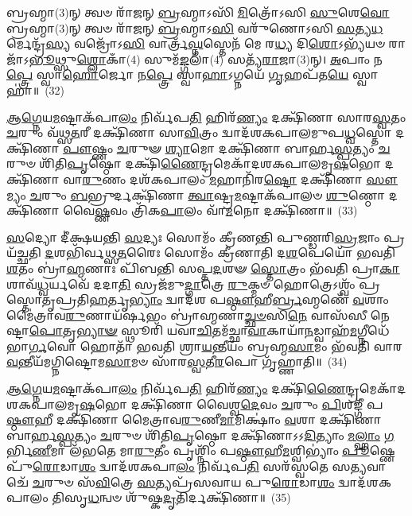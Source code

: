 𑌬𑍍𑌰𑌹𑍍𑌮𑌾(3)𑌨𑍍 𑌤𑍍𑌵𑍞 𑌰𑌾᳴𑌜𑌨𑍍 \ul{𑌬𑍍𑌰}\-𑌹𑍍𑌮𑌾\-𑌽𑌸𑌿᳴ \ul{𑌮𑌿}\-𑌤𑍍𑌰𑍋᳴\-𑌽𑌸𑌿 \ul{𑌸𑍁}\-𑌶𑍇\-\ul{𑌵𑍋} 𑌬𑍍𑌰𑌹𑍍𑌮𑌾(3)𑌨𑍍 𑌤𑍍𑌵𑍞 𑌰𑌾᳴𑌜𑌨𑍍 \ul{𑌬𑍍𑌰}\-𑌹𑍍𑌮𑌾\-𑌽\-\ul{𑌸𑌿} 𑌵𑌰𑍁᳴𑌣𑍋\-𑌽𑌸𑌿 \ul{𑌸}\-𑌤𑍍𑌯\-\ul{𑌧}\-𑌰𑍍𑌮𑍇𑌨𑍍𑌦𑍍𑌰᳴\-\ul{𑌸𑍍𑌯} 𑌵𑌜𑍍𑌰𑍋᳴\-𑌽\-\ul{𑌸𑌿} 𑌵𑌾𑌰𑍍𑌤𑍍𑌰᳴\-\ul{𑌘𑍍𑌨}\-𑌸𑍍𑌤𑍇𑌨᳴ 𑌮𑍇 𑌰\-\ul{𑌧𑍍𑌯} 𑌦𑌿\-\ul{𑌶𑍋}\-\-𑌽𑌭𑍍𑌯᳴𑌯𑍞 𑌰𑌾𑌜𑌾᳴\-𑌽\-\ul{𑌭𑍂}\-𑌥𑍍𑌸𑍁\-\ul{𑌶𑍍𑌲𑍋}\-𑌕𑌾𑌁(4) 𑌸𑍁𑌮᳴\-\ul{𑌙𑍍𑌗}\-𑌲𑌾𑌁(4) 𑌸𑌤𑍍𑌯᳴\-\ul{𑌰𑌾}\-𑌜𑌾(3)𑌨𑍍। \ul{𑌅}\-𑌪𑌾𑌂 𑌨\-\ul{𑌪𑍍𑌤𑍍𑌰𑍇} 𑌸𑍍𑌵𑌾\-\ul{𑌹𑍋}\-𑌰𑍍𑌜𑍋 𑌨\-\ul{𑌪𑍍𑌤𑍍𑌰𑍇} 𑌸𑍍𑌵𑌾\-\ul{𑌹𑌾}\-\-𑌽𑌗𑍍𑌨𑌯𑍇᳴ \ul{𑌗𑍃}\-𑌹𑌪᳴𑌤\-\ul{𑌯𑍇} 𑌸𑍍𑌵𑌾𑌹𑌾॑॥~(32)

{\anuvakamend[{\-\ul{𑌸}\-𑌤𑍍𑌯𑍗𑌜𑌾॑𑌶𑍍𑌚𑌤𑍍𑌵𑌾\-\ul{𑌰𑌿}\-\-\ul{𑍞}\-𑌶𑌚𑍍𑌚᳴}]}%

\-\ul{𑌆}\-\-\ul{𑌗𑍍𑌨𑍇}\-𑌯\-\ul{𑌮}\-𑌷𑍍𑌟𑌾\-𑌕᳴𑌪𑌾\-\ul{𑌲𑌂} 𑌨𑌿𑌰𑍍𑌵᳴𑌪\-\ul{𑌤𑌿} 𑌹𑌿𑌰᳴\-\ul{𑌣𑍍𑌯𑌂} 𑌦𑌕𑍍𑌷𑌿᳴𑌣𑌾 𑌸𑌾𑌰\-\ul{𑌸𑍍𑌵}\-𑌤𑌂 \ul{𑌚}\-𑌰𑍁𑌂 𑌵᳴𑌥𑍍𑌸\-\ul{𑌤}\-𑌰𑍀 𑌦𑌕𑍍𑌷𑌿᳴𑌣𑌾 𑌸𑌾\-\ul{𑌵𑌿}\-𑌤𑍍𑌰𑌂 𑌦𑍍𑌵𑌾𑌦᳴𑌶\-𑌕𑌪𑌾𑌲𑌮𑍁𑌪\-\ul{𑌧𑍍𑌵}\-𑌸𑍍𑌤𑍋 𑌦𑌕𑍍𑌷𑌿᳴𑌣𑌾 \ul{𑌪𑍗}\-𑌷𑍍𑌣𑌂 \ul{𑌚}\-𑌰𑍁𑍟 \ul{𑌶𑍍𑌯𑌾}\-𑌮𑍋 𑌦𑌕𑍍𑌷𑌿᳴𑌣𑌾 𑌬𑌾𑌰𑍍\mbox{}𑌹\-\ul{𑌸𑍍𑌪}\-𑌤𑍍𑌯𑌂 \ul{𑌚}\-𑌰𑍁𑍞 𑌶𑌿᳴𑌤𑌿\-\ul{𑌪𑍃}\-𑌷𑍍𑌠𑍋 𑌦𑌕𑍍𑌷𑌿᳴\-\ul{𑌣𑍈}\-𑌨𑍍𑌦𑍍𑌰𑌮𑍇𑌕𑌾᳴\-𑌦𑌶\-𑌕𑌪𑌾𑌲𑌮𑍃\-\ul{𑌷}\-𑌭𑍋 𑌦𑌕𑍍𑌷𑌿᳴𑌣𑌾 𑌵𑌾\-\ul{𑌰𑍁}\-𑌣𑌂 𑌦𑌶᳴\-𑌕𑌪𑌾𑌲𑌂 \ul{𑌮}\-𑌹𑌾𑌨𑌿᳴𑌰\-\ul{𑌷𑍍𑌟𑍋} 𑌦𑌕𑍍𑌷𑌿᳴𑌣𑌾 \ul{𑌸𑍗}\-𑌮𑍍𑌯𑌂 \ul{𑌚}\-𑌰𑍁𑌂 \ul{𑌬}\-𑌭𑍍𑌰𑍁𑌰𑍍𑌦𑌕𑍍𑌷𑌿᳴𑌣𑌾 \ul{𑌤𑍍𑌵𑌾}\-𑌷𑍍𑌟𑍍𑌰\-\ul{𑌮}\-𑌷𑍍𑌟𑌾𑌕᳴𑌪𑌾𑌲𑍞 \ul{𑌶𑍁}\-𑌣𑍍𑌠𑍋 𑌦𑌕𑍍𑌷𑌿᳴𑌣𑌾 𑌵𑍈\-\ul{𑌷𑍍𑌣}\-𑌵𑌂 𑌤𑍍𑌰𑌿᳴𑌕\-\ul{𑌪𑌾}\-𑌲𑌂 𑌵𑌾᳴\-\ul{𑌮}\-𑌨𑍋 𑌦𑌕𑍍𑌷𑌿᳴𑌣𑌾॥~(33)

{\anuvakamend[{\-\ul{𑌆}\-\-\ul{𑌗𑍍𑌨𑍇}\-𑌯𑌂 𑌦𑍍𑌵𑌿𑌚᳴𑌤𑍍𑌵𑌾𑌰𑌿𑍞𑌶𑌤𑍍}]}%

\-\ul{𑌸}\-𑌦𑍍𑌯𑍋 𑌦𑍀॑𑌕𑍍𑌷𑌯𑌨𑍍𑌤𑌿 \ul{𑌸}\-𑌦𑍍𑌯𑌃 𑌸𑍋𑌮𑌂᳴ 𑌕𑍍𑌰𑍀𑌣𑌨𑍍𑌤𑌿 𑌪𑍁𑌣𑍍𑌡𑌰𑌿\-\ul{𑌸𑍍𑌰}\-𑌜𑌾𑌂 𑌪𑍍𑌰 𑌯᳴𑌚𑍍𑌛𑌤𑌿 \ul{𑌦}\-𑌶𑌭𑌿᳴𑌰𑍍𑌵𑌥𑍍𑌸\-\ul{𑌤}\-𑌰𑍈𑌃 𑌸𑍋𑌮𑌂᳴ 𑌕𑍍𑌰𑍀𑌣𑌾𑌤𑌿 𑌦\-\ul{𑌶}\-𑌪𑍇𑌯𑍋᳴ 𑌭𑌵𑌤𑌿 \ul{𑌶}\-𑌤𑌂 𑌬𑍍𑌰𑌾॑\-\ul{𑌹𑍍𑌮}\-𑌣𑌾𑌃 𑌪𑌿᳴𑌬𑌨𑍍𑌤𑌿 𑌸𑌪𑍍𑌤\-\ul{𑌦}\-𑌶𑍟 \ul{𑌸𑍍𑌤𑍋}\-𑌤𑍍𑌰𑌂 𑌭᳴𑌵𑌤𑌿 𑌪𑍍𑌰𑌾\-\ul{𑌕𑌾}\-𑌶𑌾𑌵᳴\-\ul{𑌧𑍍𑌵}\-𑌰𑍍𑌯𑌵𑍇᳴ 𑌦𑌦𑌾\-\ul{𑌤𑌿} 𑌸𑍍𑌰𑌜᳴𑌮𑍁\-\ul{𑌦𑍍𑌗𑌾}\-𑌤𑍍𑌰𑍇 \ul{𑌰𑍁}\-𑌕𑍍𑌮𑍞 𑌹𑍋𑌤𑍍𑌰𑍇\-𑌽𑌶𑍍𑌵𑌂᳴ 𑌪𑍍𑌰𑌸𑍍𑌤𑍋𑌤𑍃𑌪𑍍𑌰𑌤𑌿\-\ul{𑌹}\-𑌰𑍍𑌤𑍃\-\ul{𑌭𑍍𑌯𑌾𑌂} 𑌦𑍍𑌵𑌾𑌦᳴𑌶 𑌪\-\ul{𑌷𑍍𑌠𑍗}\-𑌹𑍀\-\ul{𑌰𑍍𑌬𑍍𑌰}\-𑌹𑍍𑌮𑌣𑍇᳴ \ul{𑌵}\-𑌶𑌾𑌂 𑌮𑍈॑𑌤𑍍𑌰𑌾𑌵\-\ul{𑌰𑍁}\-𑌣𑌾𑌯᳴𑌰𑍍\mbox{}\-\ul{𑌷}\-𑌭𑌂 𑌬𑍍𑌰𑌾॑𑌹𑍍𑌮𑌣𑌾\-\ul{𑌚𑍍𑌛}\-\-\ul{𑍞}\-𑌸𑌿\-\ul{𑌨𑍇} 𑌵𑌾𑌸᳴𑌸𑍀 𑌨𑍇𑌷𑍍𑌟𑌾\-\ul{𑌪𑍋}\-𑌤𑍃\-\ul{𑌭𑍍𑌯𑌾}\-\-\ul{𑍟} 𑌸𑍍𑌥𑍂𑌰𑌿᳴ 𑌯𑌵𑌾\-\ul{𑌚𑌿}\-𑌤𑌮᳴𑌚𑍍𑌛𑌾\-\ul{𑌵𑌾}\-𑌕𑌾𑌯𑌾᳴\-\ul{𑌨}\-𑌡𑍍𑌵𑌾𑌹᳴\-\ul{𑌮}\-𑌗𑍍𑌨𑍀𑌧𑍇᳴ 𑌭𑌾\-\ul{𑌰𑍍𑌗}\-𑌵𑍋 𑌹𑍋𑌤𑌾᳴ 𑌭𑌵𑌤𑌿 𑌶𑍍𑌰𑌾\-\ul{𑌯}\-𑌨𑍍𑌤𑍀𑌯𑌂᳴ 𑌬𑍍𑌰𑌹𑍍𑌮\-\ul{𑌸𑌾}\-𑌮𑌂 𑌭᳴𑌵𑌤𑌿 𑌵𑌾𑌰\-\ul{𑌵}\-𑌨𑍍𑌤𑍀𑌯᳴𑌮𑌗𑍍𑌨𑌿𑌷𑍍𑌟𑍋𑌮\-\ul{𑌸𑌾}\-𑌮𑍞 𑌸𑌾᳴𑌰\-\ul{𑌸𑍍𑌵}\-𑌤𑍀\-\ul{𑌰}\-𑌪𑍋 𑌗𑍃᳴𑌹𑍍𑌣𑌾𑌤𑌿॥~(34)

{\anuvakamend[{\-\ul{𑌵𑌾}\-\-\ul{𑌰}\-\-\ul{𑌵}\-𑌨𑍍𑌤𑍀𑌯𑌂᳴ \ul{𑌚}\-𑌤𑍍𑌵𑌾𑌰𑌿᳴ 𑌚}]}%

\-\ul{𑌆}\-\-\ul{𑌗𑍍𑌨𑍇}\-𑌯\-\ul{𑌮}\-𑌷𑍍𑌟𑌾\-𑌕᳴𑌪𑌾\-\ul{𑌲𑌂} 𑌨𑌿𑌰𑍍𑌵᳴𑌪\-\ul{𑌤𑌿} 𑌹𑌿𑌰᳴\-\ul{𑌣𑍍𑌯𑌂} 𑌦𑌕𑍍𑌷𑌿᳴\-\ul{𑌣𑍈}\-𑌨𑍍𑌦𑍍𑌰𑌮𑍇𑌕𑌾᳴\-𑌦𑌶\-𑌕𑌪𑌾𑌲𑌮𑍃\-\ul{𑌷}\-𑌭𑍋 𑌦𑌕𑍍𑌷𑌿᳴𑌣𑌾 𑌵𑍈𑌶𑍍𑌵\-\ul{𑌦𑍇}\-𑌵𑌂 \ul{𑌚}\-𑌰𑍁𑌂 \ul{𑌪𑌿}\-𑌶𑌙𑍍𑌗𑍀᳴ 𑌪\-\ul{𑌷𑍍𑌠𑍗}\-𑌹𑍀 𑌦𑌕𑍍𑌷𑌿᳴𑌣𑌾 𑌮𑍈𑌤𑍍𑌰𑌾𑌵\-\ul{𑌰𑍁}\-𑌣𑍀\-\ul{𑌮𑌾}\-𑌮𑌿𑌕𑍍𑌷𑌾𑌂॑ \ul{𑌵}\-𑌶𑌾 𑌦𑌕𑍍𑌷𑌿᳴𑌣𑌾 𑌬𑌾𑌰𑍍\mbox{}𑌹\-\ul{𑌸𑍍𑌪}\-𑌤𑍍𑌯𑌂 \ul{𑌚}\-𑌰𑍁𑍞 𑌶𑌿᳴𑌤𑌿\-\ul{𑌪𑍃}\-𑌷𑍍𑌠𑍋 𑌦𑌕𑍍𑌷𑌿᳴𑌣𑌾\-𑌽\-𑌽\-\ul{𑌦𑌿}\-𑌤𑍍𑌯𑌾𑌂 \ul{𑌮}\-\-\ul{𑌲𑍍}\-\mbox{}𑌹𑌾𑌂 \ul{𑌗}\-𑌰𑍍𑌭𑌿\-\ul{𑌣𑍀}\-𑌮𑌾 𑌲᳴𑌭𑌤𑍇 𑌮𑌾\-\ul{𑌰𑍁}\-𑌤𑍀𑌂 𑌪𑍃𑌶𑍍𑌨𑌿𑌂᳴ 𑌪\-\ul{𑌷𑍍𑌠𑍗}\-𑌹𑍀\-\ul{𑌮}\-𑌶𑍍𑌵𑌿\-𑌭𑍍𑌯𑌾𑌂॑ \ul{𑌪𑍂}\-𑌷𑍍𑌣𑍇 𑌪𑍁᳴\-\ul{𑌰𑍋}\-𑌡𑌾\-\ul{𑌶𑌂} 𑌦𑍍𑌵𑌾𑌦᳴𑌶\-𑌕𑌪𑌾\-\ul{𑌲𑌂} 𑌨𑌿𑌰𑍍𑌵᳴𑌪\-\ul{𑌤𑌿} 𑌸𑌰᳴𑌸𑍍𑌵𑌤𑍇 𑌸\-\ul{𑌤𑍍𑌯}\-𑌵𑌾𑌚𑍇᳴ \ul{𑌚}\-𑌰𑍁𑍞 𑌸᳴\-\ul{𑌵𑌿}\-𑌤𑍍𑌰𑍇 \ul{𑌸}\-𑌤𑍍𑌯𑌪𑍍𑌰᳴𑌸𑌵𑌾𑌯 𑌪𑍁\-\ul{𑌰𑍋}\-𑌡𑌾\-\ul{𑌶𑌂} 𑌦𑍍𑌵𑌾𑌦᳴𑌶\-𑌕𑌪𑌾𑌲𑌂 𑌤𑌿𑌸𑍃\-\ul{𑌧}\-𑌨𑍍𑌵𑍞 𑌶𑍁᳴𑌷𑍍𑌕\-\ul{𑌦𑍃}\-𑌤𑌿𑌰𑍍𑌦𑌕𑍍𑌷𑌿᳴𑌣𑌾॥~(35)

